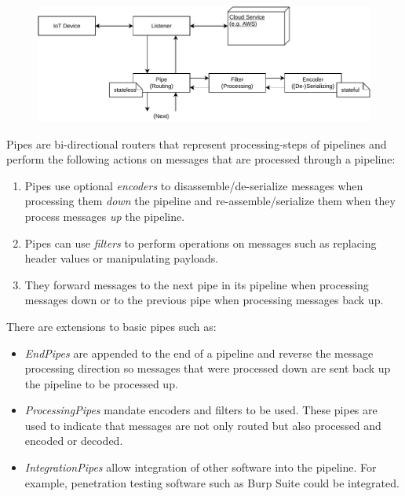 \begin{figure}[h]
    \centering
    \includegraphics[width=14cm]{img/ch04/Architecture - Pipes and Filters4.pdf}
    \label{fig:design-pipes-and-filters}
\end{figure}
Pipes are bi-directional routers that represent processing-steps of pipelines and perform the following actions on messages that are processed through a pipeline:
\begin{enumerate}
    \item Pipes use optional \emph{encoders} to disassemble/de-serialize messages when processing them \emph{down} the pipeline and re-assemble/serialize them when they process messages \emph{up} the pipeline.
    \item Pipes can use \emph{filters} to perform operations on messages such as replacing header values or manipulating payloads.
    \item They forward messages to the next pipe in its pipeline when processing messages down or to the previous pipe when processing messages back up.
\end{enumerate}
There are extensions to basic pipes such as:
\begin{itemize}
    \item \emph{EndPipes} are appended to the end of a pipeline and reverse the message processing direction so messages that were processed down are sent back up the pipeline to be processed up.
    \item \emph{ProcessingPipes} mandate encoders and filters to be used. These pipes are used to indicate that messages are not only routed but also processed and encoded or decoded.
    \item \emph{IntegrationPipes} allow integration of other software into the pipeline. For example, penetration testing software such as Burp Suite could be integrated.
\end{itemize}

